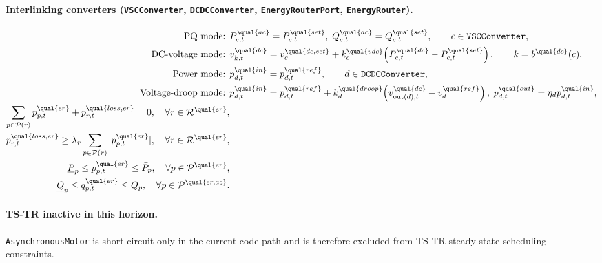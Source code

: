 \paragraph{Interlinking converters (\texttt{VSCConverter}, \texttt{DCDCConverter}, \texttt{EnergyRouterPort}, \texttt{EnergyRouter}).}
\begin{align}
\text{PQ mode: } &
P^{\qual{ac}}_{c,t}=P^{\qual{set}}_{c,t},\;
Q^{\qual{ac}}_{c,t}=Q^{\qual{set}}_{c,t},
\qquad c\in\texttt{VSCConverter},
\notag\\
\text{DC-voltage mode: } &
v^{\qual{dc}}_{k,t}=v^{\qual{dc,set}}_{c}
+k^{\qual{vdc}}_{c}\!\left(P^{\qual{dc}}_{c,t}-P^{\qual{set}}_{c,t}\right),
\qquad k=b^{\qual{dc}}(c),
\label{eq:tstr-comp-vsc-mode}
\\
\text{Power mode: } &
p^{\qual{in}}_{d,t}=p^{\qual{ref}}_{d,t},
\qquad d\in\texttt{DCDCConverter},
\notag\\
\text{Voltage-droop mode: } &
p^{\qual{in}}_{d,t}=p^{\qual{ref}}_{d,t}
+k^{\qual{droop}}_d\!\left(v^{\qual{dc}}_{\text{out}(d),t}-v^{\qual{ref}}_d\right),\;
p^{\qual{out}}_{d,t}=\eta_d p^{\qual{in}}_{d,t},
\label{eq:tstr-comp-dcdc-mode}
\\
\sum_{p\in\mathcal{P}(r)} p^{\qual{er}}_{p,t}+p^{\qual{loss,er}}_{r,t}=0,
\quad \forall r\in\mathcal{R}^{\qual{er}},
\notag\\
p^{\qual{loss,er}}_{r,t}\ge \lambda_r\sum_{p\in\mathcal{P}(r)} |p^{\qual{er}}_{p,t}|,
\quad \forall r\in\mathcal{R}^{\qual{er}},
\label{eq:tstr-comp-er}
\\
\underline P_p\le p^{\qual{er}}_{p,t}\le \bar P_p,
\quad \forall p\in\mathcal{P}^{\qual{er}},
\notag\\
\underline Q_p\le q^{\qual{er}}_{p,t}\le \bar Q_p,
\quad \forall p\in\mathcal{P}^{\qual{er,ac}}.
\notag
\end{align}

\paragraph{TS-TR inactive in this horizon.}
\texttt{AsynchronousMotor} is short-circuit-only in the current code path and is
therefore excluded from TS-TR steady-state scheduling constraints.


